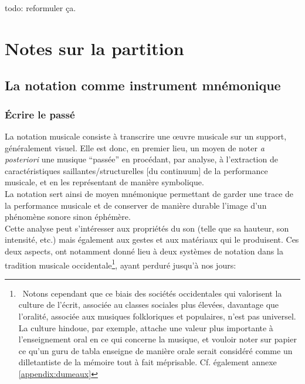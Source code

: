 todo: reformuler ça.

\section{Notes sur la partition}

\subsection{La notation comme instrument mnémonique}

\subsubsection{Écrire le passé}

\noindent La notation musicale consiste à transcrire une œuvre musicale sur un support, généralement visuel. Elle est donc, en premier lieu, un moyen de noter \textit{a posteriori} une musique ``passée'' en procédant, par analyse, à l'extraction de caractéristiques saillantes/structurelles [du continuum] de la performance musicale, et en les représentant de manière symbolique.\\
\indent La notation sert ainsi de moyen mnémonique permettant de garder une trace de la performance musicale et de conserver de manière durable l'image d'un phénomène sonore sinon éphémère.\\
\indent Cette analyse peut s'intéresser aux propriétés du son (telle que sa hauteur, son intensité, etc.) mais également aux gestes et aux matériaux qui le produisent. Ces deux aspects, ont notamment donné lieu à deux systèmes de notation dans la tradition musicale occidentale\footnote{~Notons cependant que ce biais des sociétés occidentales qui valorisent la culture de l'écrit, associée au classes sociales plus élevées, davantage que l'oralité, associée aux musiques folkloriques et populaires, n'est pas universel. La culture hindoue, par exemple, attache une valeur plus importante à l'enseignement oral en ce qui concerne la musique, et vouloir noter sur papier ce qu'un guru de tabla enseigne de manière orale serait considéré comme un dilletantiste de la mémoire tout à fait méprisable. Cf. également annexe \ref{appendix:dumeaux}}, ayant perduré jusqu'à nos jours:
\vspace{-1em}
